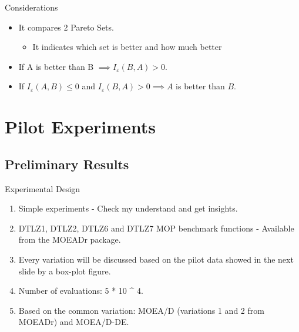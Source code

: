 \documentclass[ignorenonframetext,]{beamer}
\providecommand{\tightlist}{%
  \setlength{\itemsep}{0pt}\setlength{\parskip}{0pt}}
\begin{document}
\begin{frame}{Considerations}

\begin{itemize}
\tightlist
\item
  It compares 2 Pareto Sets.

  \begin{itemize}
  \tightlist
  \item
    It indicates which set is better and how much better
  \end{itemize}
\item
  If A is better than B \(\implies I_{\varepsilon}(B,A) > 0\).
\item
  If \(I_{\varepsilon}(A,B) \leq 0\) and
  \(I_{\varepsilon}(B,A) > 0 \implies A\) is better than \(B\).
\end{itemize}

\end{frame}

\section{Pilot Experiments}\label{pilot-experiments}

\subsection{Preliminary Results}\label{preliminary-results}

\begin{frame}{Experimental Design}

\begin{enumerate}
\def\labelenumi{\arabic{enumi}.}
\tightlist
\item
  Simple experiments - Check my understand and get insights.
\item
  DTLZ1, DTLZ2, DTLZ6 and DTLZ7 MOP benchmark functions - Available from
  the MOEADr package.
\item
  Every variation will be discussed based on the pilot data showed in
  the next slide by a box-plot figure.
\item
  Number of evaluations: 5 * 10 \^{} 4.
\item
  Based on the common variation: MOEA/D (variations 1 and 2 from MOEADr)
  and MOEA/D-DE.
\end{enumerate}

\end{frame}
\end{document}
